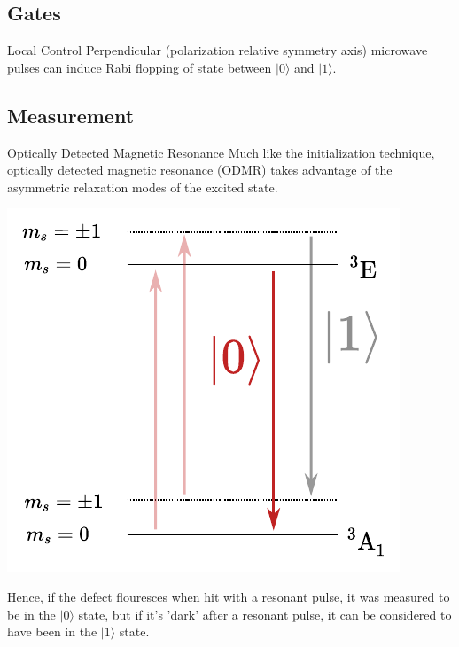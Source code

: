 \documentclass[11pt]{beamer}
\begin{document}
\subsection{Gates}
\begin{frame}{Local Control}
Perpendicular (polarization relative symmetry axis) microwave pulses can induce Rabi flopping of state between $\vert 0 \rangle$ and $\vert 1 \rangle$.
\end{frame}


\subsection{Measurement}
\begin{frame}{Optically Detected Magnetic Resonance}\small
Much like the initialization technique, optically detected magnetic resonance (ODMR) takes advantage of the asymmetric relaxation modes of the excited state.

\begin{center}
\includegraphics[scale=0.6]{energy_measure.pdf}
\end{center}

Hence, if the defect flouresces when hit with a resonant pulse, it was measured to be in the $\vert 0 \rangle$ state, but if it's 'dark' after a resonant pulse, it can be considered to have been in the $\vert 1 \rangle$ state.

\medskip


\end{frame}
\end{document}
